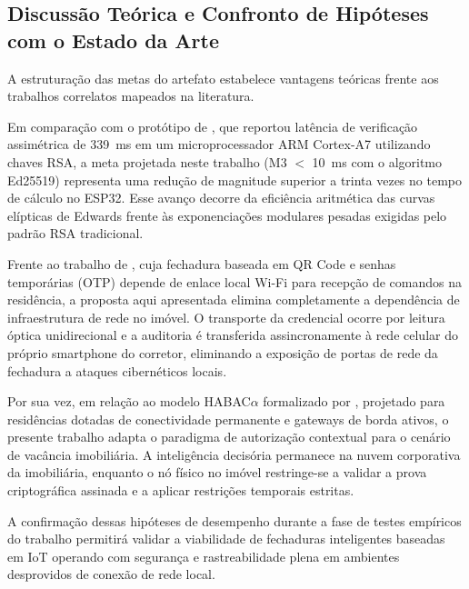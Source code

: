 \subsection{Discussão Teórica e Confronto de Hipóteses com o Estado da Arte}
\label{subsec:discussao-comparativa}

A estruturação das metas do artefato estabelece vantagens teóricas frente aos trabalhos correlatos mapeados na literatura.

Em comparação com o protótipo de , que reportou latência de verificação assimétrica de 339~ms em um microprocessador ARM Cortex-A7 utilizando chaves RSA, a meta projetada neste trabalho (M3 $<$ 10~ms com o algoritmo Ed25519) representa uma redução de magnitude superior a trinta vezes no tempo de cálculo no ESP32. Esse avanço decorre da eficiência aritmética das curvas elípticas de Edwards frente às exponenciações modulares pesadas exigidas pelo padrão RSA tradicional.

Frente ao trabalho de , cuja fechadura baseada em QR Code e senhas temporárias (OTP) depende de enlace local Wi-Fi para recepção de comandos na residência, a proposta aqui apresentada elimina completamente a dependência de infraestrutura de rede no imóvel. O transporte da credencial ocorre por leitura óptica unidirecional e a auditoria é transferida assincronamente à rede celular do próprio smartphone do corretor, eliminando a exposição de portas de rede da fechadura a ataques cibernéticos locais.

Por sua vez, em relação ao modelo HABAC$\alpha$ formalizado por , projetado para residências dotadas de conectividade permanente e gateways de borda ativos, o presente trabalho adapta o paradigma de autorização contextual para o cenário de vacância imobiliária. A inteligência decisória permanece na nuvem corporativa da imobiliária, enquanto o nó físico no imóvel restringe-se a validar a prova criptográfica assinada e a aplicar restrições temporais estritas.

A confirmação dessas hipóteses de desempenho durante a fase de testes empíricos do trabalho permitirá validar a viabilidade de fechaduras inteligentes baseadas em IoT operando com segurança e rastreabilidade plena em ambientes desprovidos de conexão de rede local.
